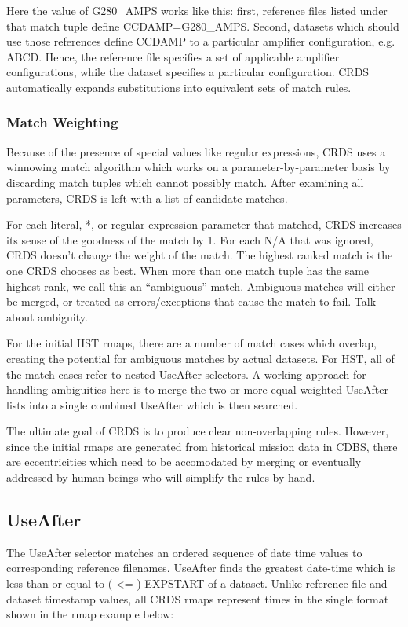 \documentclass[letterpaper,10pt,english]{sphinxmanual}
\begin{document}
Here the value of G280\_AMPS works like this:  first,   reference files listed
under that match tuple define CCDAMP=G280\_AMPS.   Second, datasets which should
use those references define CCDAMP to a particular amplifier configuration,
e.g.  ABCD.   Hence,  the reference file specifies a set of applicable
amplifier configurations,  while the dataset specifies a particular
configuration.   CRDS automatically expands substitutions into equivalent sets
of match rules.


\subsubsection{Match Weighting}
\label{rmap_syntax:match-weighting}
Because of the presence of special values like regular expressions, CRDS uses a
winnowing match algorithm which works on a parameter-by-parameter basis by
discarding match tuples which cannot possibly match. After examining all
parameters,   CRDS is left with a list of candidate matches.

For each literal, *, or regular expression parameter that matched,  CRDS
increases its sense of the goodness of the match by 1.   For each N/A that was
ignored, CRDS doesn't change the weight of the match.   The highest ranked match
is the one CRDS chooses as best.   When more than one match tuple has the same
highest rank, we call this an ``ambiguous'' match.   Ambiguous matches will
either be merged,  or treated as errors/exceptions that cause the match to fail.
Talk about ambiguity.

For the initial HST rmaps, there are a number of match cases which overlap,
creating the potential for ambiguous matches by actual datasets.   For HST,  all
of the match cases refer to nested UseAfter selectors.  A working approach for
handling ambiguities here is to merge the two or more equal weighted UseAfter
lists into a single combined UseAfter which is then searched.

The ultimate goal of CRDS is to produce clear non-overlapping rules.  However,
since the initial rmaps are generated from historical mission data in CDBS,
there are eccentricities which need to be accomodated by merging or eventually
addressed by human beings who will simplify the rules by hand.


\subsection{UseAfter}
\label{rmap_syntax:useafter}
The UseAfter selector matches an ordered sequence of date time values to
corresponding reference filenames.   UseAfter finds the greatest date-time which
is less than or equal to ( \textless{}= ) EXPSTART of a dataset.   Unlike
reference file and dataset timestamp values,  all CRDS rmaps represent times in
the single format shown in the rmap example below:
\end{document}
